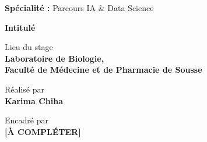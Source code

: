\documentclass[12pt,a4paper]{report}
\begin{document}
\begin{titlepage}
\begin{center}
  \vspace{0.5cm}
  \textbf{Spécialité :} Parcours IA \& Data Science

  \vspace{1cm}
  {\Large\bfseries Intitulé}

  \vspace{0.5cm}

  \vspace{2cm}
  \begin{minipage}{0.3\textwidth}\centering
    Lieu du stage\\ \textbf{Laboratoire de Biologie,\\Faculté de Médecine et de Pharmacie de Sousse}
  \end{minipage}
  \begin{minipage}{0.3\textwidth}\centering
    Réalisé par\\ \textbf{Karima Chiha}
  \end{minipage}
  \begin{minipage}{0.3\textwidth}\centering
    Encadré par\\ \textbf{[À COMPLÉTER]}
  \end{minipage}
\end{center}

\end{titlepage}

\renewcommand{\contentsname}{Table des matières}
\tableofcontents
\thispagestyle{empty}
\newpage

\listoffigures
\thispagestyle{empty}
\newpage

\listoftables
\thispagestyle{empty}
\newpage

\end{document}
